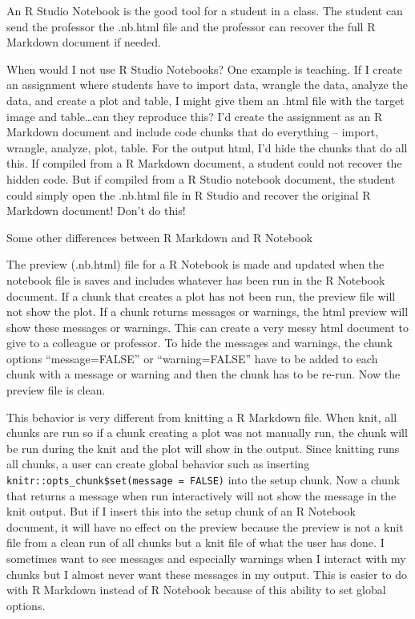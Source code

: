 \documentclass[]{book}
\begin{document}
An R Studio Notebook is the good tool for a student in a class. The student can send the professor the .nb.html file and the professor can recover the full R Markdown document if needed.

When would I not use R Studio Notebooks? One example is teaching. If I create an assignment where students have to import data, wrangle the data, analyze the data, and create a plot and table, I might give them an .html file with the target image and table\ldots can they reproduce this? I'd create the assignment as an R Markdown document and include code chunks that do everything -- import, wrangle, analyze, plot, table. For the output html, I'd hide the chunks that do all this. If compiled from a R Markdown document, a student could not recover the hidden code. But if compiled from a R Studio notebook document, the student could simply open the .nb.html file in R Studio and recover the original R Markdown document! Don't do this!

Some other differences between R Markdown and R Notebook

The preview (.nb.html) file for a R Notebook is made and updated when the notebook file is saves and includes whatever has been run in the R Notebook document. If a chunk that creates a plot has not been run, the preview file will not show the plot. If a chunk returns messages or warnings, the html preview will show these messages or warnings. This can create a very messy html document to give to a colleague or professor. To hide the messages and warnings, the chunk options ``message=FALSE'' or ``warning=FALSE'' have to be added to each chunk with a message or warning and then the chunk has to be re-run. Now the preview file is clean.

This behavior is very different from knitting a R Markdown file. When knit, all chunks are run so if a chunk creating a plot was not manually run, the chunk will be run during the knit and the plot will show in the output. Since knitting runs all chunks, a user can create global behavior such as inserting \texttt{knitr::opts\_chunk\$set(message\ =\ FALSE)} into the setup chunk. Now a chunk that returns a message when run interactively will not show the message in the knit output. But if I insert this into the setup chunk of an R Notebook document, it will have no effect on the preview because the preview is not a knit file from a clean run of all chunks but a knit file of what the user has done. I sometimes want to see messages and especially warnings when I interact with my chunks but I almost never want these messages in my output. This is easier to do with R Markdown instead of R Notebook because of this ability to set global options.
\end{document}
